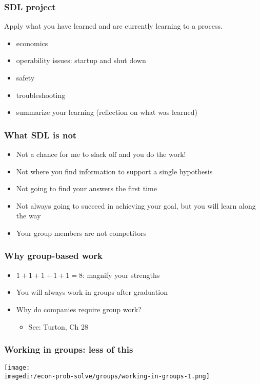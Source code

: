 \begin{frame}\frametitle{SDL project}
	Apply what you have learned and are currently learning to a process.
	\vspace{12pt}
	\begin{itemize}
		\item	economics
		\item	operability issues: startup and shut down
		\item	safety
		\item	troubleshooting
		\item	summarize your learning (reflection on what was learned)
	\end{itemize}
\end{frame}

\begin{frame}\frametitle{What SDL is not}
	\begin{itemize}
		\item	Not a chance for me to slack off and you do the work!
		\item	Not where you find information to support a single hypothesis {}
		\item	Not going to find your answers the first time
		\item	Not always going to succeed in achieving your goal, but you will learn along the way
		\item	Your group members are not competitors
	\end{itemize}
\end{frame}

\begin{frame}\frametitle{Why group-based work}
	\begin{itemize}
		\item	$1+1+1+1+1 = 8$: magnify your strengths
		\item	You will always work in groups after graduation
		\item	Why do companies require group work?
		\begin{itemize}
			\item	See: Turton, Ch 28
		\end{itemize}	
	\end{itemize}
\end{frame}

\begin{frame}\frametitle{Working in groups: less of this}
	\begin{center}
		\texttt{[image: \\imagedir/econ-prob-solve/groups/working-in-groups-1.png]}
	\end{center}
\end{frame}

